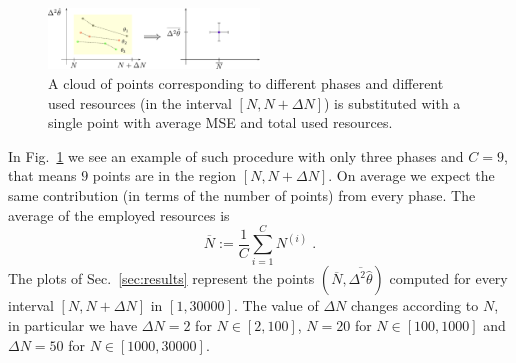 \documentclass[aps, pra, 10pt, twocolumn, superscriptaddress,floatfix]{revtex4-1}
\begin{document}
%
\begin{figure}[!t]
	\begin{center}
		\includegraphics[width=0.5\textwidth]{cloud.pdf}
	\end{center}
	\caption{A cloud of points corresponding to different phases and different used resources (in the interval $[N, N + \Delta N]$) is substituted with a single point with average MSE and total used resources.}
	\label{fig:cloud}
\end{figure}
%
In Fig.~\ref{fig:cloud} we see an example of such procedure with only three phases and $C=9$, that means $9$ points are in the region $[N, N + \Delta N]$. On average we expect the same contribution (in terms of the number of points) from every phase. The average of the employed resources is
%
\begin{equation}
	\overline{N} := \frac{1}{C} \sum_{i=1}^C N^{(i)} \; .
\end{equation}
%
The plots of Sec.~\ref{sec:results} represent the points $(\overline{N}, \overline{\Delta^2 \hat{\theta}})$ computed for every interval $[N, N + \Delta N]$ in $[1, 30000]$. 
The value of $\Delta N$ changes according to $N$, in particular we have $\Delta N = 2$ for $N \in \left[2, 100 \right]$, $N = 20$ for $N \in \left[100, 1000 \right]$ and $\Delta N = 50$ for $N \in \left[1000, 30000 \right]$. 
\end{document}

